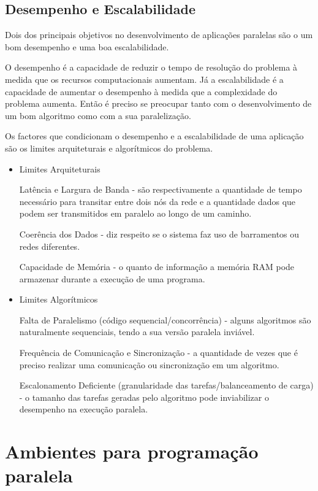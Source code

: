 \subsection{Desempenho e Escalabilidade}

Dois dos principais objetivos no desenvolvimento de aplicações paralelas são o um bom desempenho e uma boa escalabilidade.

O desempenho é a capacidade de reduzir o tempo de resolução do problema à medida que os recursos computacionais aumentam. Já a escalabilidade é a capacidade de aumentar o desempenho à medida que a complexidade do problema aumenta. Então é preciso se preocupar tanto com o desenvolvimento de um bom algoritmo como com a sua paralelização.

Os factores que condicionam o desempenho e a escalabilidade de uma aplicação são os limites arquiteturais e algorítmicos do problema.

\begin{itemize}
	
	\item Limites Arquiteturais
	
Latência e Largura de Banda - são respectivamente a quantidade de tempo necessário para transitar entre dois nós da rede e a quantidade dados que podem ser transmitidos em paralelo ao longo de um caminho.

Coerência dos Dados - diz respeito se o sistema faz uso de barramentos ou redes diferentes.

Capacidade de Memória - o quanto de informação a memória RAM pode armazenar durante a execução de uma programa.

	\item Limites Algorítmicos
	
Falta de Paralelismo (código sequencial/concorrência) - alguns algoritmos são naturalmente sequenciais, tendo a sua versão paralela inviável.

Frequência de Comunicação e Sincronização - a quantidade de vezes que é preciso realizar uma comunicação ou sincronização em um algoritmo.

Escalonamento Deficiente (granularidade das tarefas/balanceamento de carga) - o tamanho das tarefas geradas pelo algoritmo pode inviabilizar o desempenho na execução paralela.

\end{itemize}



\section{Ambientes para programação paralela}

